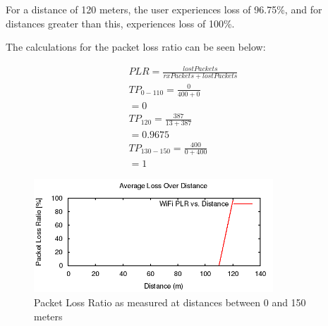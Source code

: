 \par For a distance of 120 meters, the user experiences loss of 96.75\%, and for
distances greater than this, experiences loss of 100\%.

\par The calculations for the packet loss ratio can be seen below:

\begin{gather*}
	PLR=\frac{lostPackets}{rxPackets+lostPackets} \\
	TP_{0-110}=\frac{0}{400+0}\\
	= 0 \\
	TP_{120}= \frac{387}{13+387}\\
	= 0.9675 \\
	TP_{130-150}=\frac{400}{0+400}\\
	= 1
\end{gather*}

\begin{figure}[H]
	\centering
	\includegraphics[width=0.8\textwidth]{images/EE500/QB/Images/wifi-loss}
	\caption{Packet Loss Ratio as measured at distances between 0 and 150
	meters}
	\label{fig:QBloss}
\end{figure}
